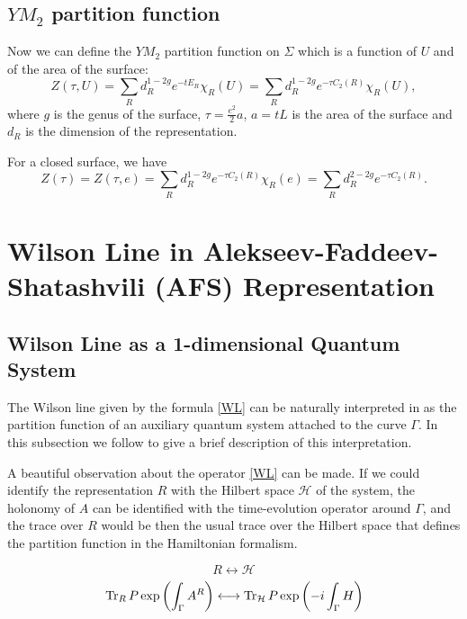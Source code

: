 \documentclass[11pt]{report}
\theoremstyle{plain}
\theoremstyle{definition}
\theoremstyle{remark}
\theoremstyle{remark}
\numberwithin{equation}{section}
\begin{document}
\subsection{$YM_2$ partition function}
Now we can define the $YM_2$ partition function on $\Sigma$ which is a function of $U$ and of the area of the surface:
%
\begin{equation}\label{Z}
Z(\tau, U) =\sum_R d_R^{1-2g} e^{-tE_R} \chi_R(U) =  \sum_R d_R^{1-2g} e^{-\tau C_2(R)} \chi_R(U),
\end{equation}
where $g$ is the genus of the surface, $\tau = \frac{e^2}{2}a$, $a=tL$ is the area of the surface and $d_R$ is the dimension of the representation.

For a closed surface, we have
%
\begin{equation}\label{Z_C}
Z(\tau) = Z(\tau, e) = \sum_R d_R^{1-2g} e^{- \tau C_2(R)} \chi_R(e) = \sum_R d_R^{2-2g} e^{- \tau C_2(R)}.
\end{equation}

\section{Wilson Line in Alekseev-Faddeev-Shatashvili (AFS) Representation}

\subsection{Wilson Line as a 1-dimensional Quantum System}

The Wilson line given by the formula \eqref{WL} can be naturally interpreted in as the partition function of an auxiliary quantum system attached to the curve $\Gamma$. In this subsection we follow \cite{CB} to give a brief description of this interpretation. 

A beautiful observation about the operator \eqref{WL} can be made. If we could identify the representation $R$ with the Hilbert space $\mathcal{H}$ of the system, the holonomy of $A$ can be identified with the time-evolution operator around $\Gamma$, and the trace over $R$ would be then the usual trace over the Hilbert space that defines the partition function in the Hamiltonian formalism.

$$
R \longleftrightarrow \mathcal{H}
$$
\begin{equation}
{\rm Tr}_R \, P\exp\left( \int_\Gamma A^R\right) \longleftrightarrow  {\rm Tr}_{\mathcal{H}} \, P\exp\left( -i\int_\Gamma H\right)
\end{equation}
\end{document}
